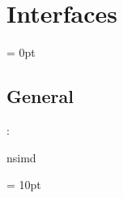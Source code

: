 
\section{Interfaces} 


\parskip = 0pt

\vspace{3mm} \subsection*{General}

: 

nsimd
\vspace{2mm}

\vspace{5mm}\parskip = 10pt 
